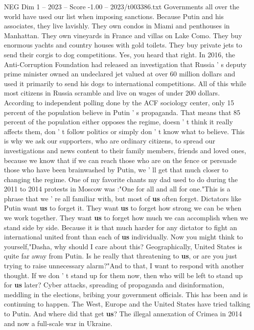 \begin{textsample}{NEG Dim 1 – 2023 – Score -1.00 – 2023/t003386.txt}
Governments all over the world have used our list when imposing sanctions.
Because Putin and his associates, they live lavishly.
They own condos in Miami and penthouses in Manhattan.
They own vineyards in France and villas on Lake Como.
They buy enormous yachts and country houses with gold toilets.
They buy private jets to send their corgis to dog competitions.
Yes, you heard that right.
In 2016, the Anti-Corruption Foundation had released an investigation that Russia ' s deputy prime minister owned an undeclared jet valued at over 60 million dollars and used it primarily to send his dogs to international competitions.
All of this while most citizens in Russia scramble and live on wages of under 200 dollars.
According to independent polling done by the ACF sociology center, only 15 percent of the population believe in Putin ' s propaganda.
That means that 85 percent of the population either opposes the regime, doesn ' t think it really affects them, don ' t follow politics or simply don ' t know what to believe.
This is why we ask our supporters, who are ordinary citizens, to spread our investigations and news content to their family members, friends and loved ones, because we know that if we can reach those who are on the fence or persuade those who have been brainwashed by Putin, we ' ll get that much closer to changing the regime.
One of my favorite chants my dad used to do during the 2011 to 2014 protests in Moscow was :"One for all and all for one."This is a phrase that we ' re all familiar with, but most of \textbf{us} often forget.
Dictators like Putin want \textbf{us} to forget it.
They want \textbf{us} to forget how strong we can be when we work together.
They want \textbf{us} to forget how much we can accomplish when we stand side by side.
Because it is that much harder for any dictator to fight an international united front than each of \textbf{us} individually.
Now you might think to yourself,"Dasha, why should I care about this?
Geographically, United States is quite far away from Putin.
Is he really that threatening to \textbf{us}, or are you just trying to raise unnecessary alarm?"And to that, I want to respond with another thought.
If we don ' t stand up for them now, then who will be left to stand up for \textbf{us} later?
Cyber attacks, spreading of propaganda and disinformation, meddling in the elections, bribing your government officials.
This has been and is continuing to happen.
The West, Europe and the United States have tried talking to Putin.
And where did that get \textbf{us}?
The illegal annexation of Crimea in 2014 and now a full-scale war in Ukraine.

\end{textsample}
